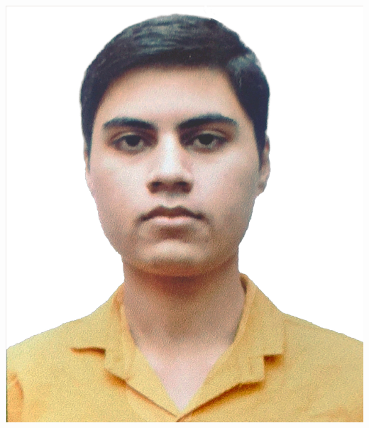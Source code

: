 \documentclass[A4,11pt]{article}
\begin{document}

\begin{minipage}[c]{0.05\textwidth}
\-\
\end{minipage}
\begin{minipage}[c]{0.2\textwidth}
\includegraphics[scale=0.25]{components/portrait.jpg}
\hfill\vline\hfill
\end{minipage}
\end{document}
